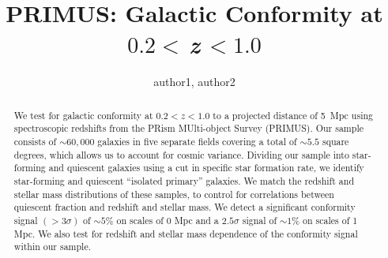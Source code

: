 \documentclass[apj,tighten,iop]{emulateapj2}
\begin{document}
\title{PRIMUS: Galactic Conformity at $0.2<\,$\MakeLowercase{\emph{z}}$\,<1.0$}

\author{
author1,
author2
}


\begin{abstract}
We test for galactic conformity at $0.2<z<1.0$ to a projected distance of 5~Mpc using spectroscopic redshifts from the PRism MUlti-object Survey (PRIMUS).
Our sample consists of $\sim60,000$ galaxies in five separate fields covering a total of $\sim5.5$ square degrees, which allows us to account for cosmic variance.
Dividing our sample into star-forming and quiescent galaxies using a cut in specific star formation rate, we identify star-forming and quiescent ``isolated primary'' galaxies.
We match the redshift and stellar mass distributions of these samples, to control for correlations between quiescent fraction and redshift and stellar mass.
We detect a significant conformity signal $(>3\sigma)$ of $\sim5$\% on scales of 0 Mpc and a $2.5\sigma$ signal of $\sim1$\% on scales of 1 Mpc.
We also test for redshift and stellar mass dependence of the conformity signal within our sample.
\end{abstract}













\end{document}
